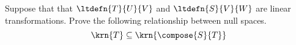 Suppose that that $\ltdefn{T}{U}{V}$ and $\ltdefn{S}{V}{W}$ are linear transformations.  Prove the following relationship between null spaces.
%
\begin{equation*}
\krn{T}\subseteq\krn{\compose{S}{T}}
\end{equation*}